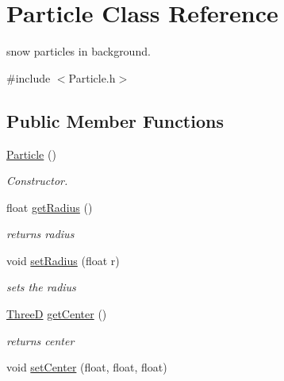 \hypertarget{class_particle}{\section{Particle Class Reference}
\label{class_particle}
}


snow particles in background.  




{\ttfamily \#include $<$Particle.\-h$>$}

\subsection*{Public Member Functions}
\begin{DoxyCompactItemize}
\item 
\hypertarget{class_particle_a40f4c7e248029d72e7714b7802d5e5e1}{\hyperlink{class_particle_a40f4c7e248029d72e7714b7802d5e5e1}{Particle} ()}\label{class_particle_a40f4c7e248029d72e7714b7802d5e5e1}

\begin{DoxyCompactList}\small\item\em Constructor. \end{DoxyCompactList}\item 
\hypertarget{class_particle_ae965a3d556ffe29c80c97bbb18ab2372}{float \hyperlink{class_particle_ae965a3d556ffe29c80c97bbb18ab2372}{get\-Radius} ()}\label{class_particle_ae965a3d556ffe29c80c97bbb18ab2372}

\begin{DoxyCompactList}\small\item\em returns radius \end{DoxyCompactList}\item 
\hypertarget{class_particle_a49ad7061bf2b2362e36b8930a089c188}{void \hyperlink{class_particle_a49ad7061bf2b2362e36b8930a089c188}{set\-Radius} (float r)}\label{class_particle_a49ad7061bf2b2362e36b8930a089c188}

\begin{DoxyCompactList}\small\item\em sets the radius \end{DoxyCompactList}\item 
\hypertarget{class_particle_af3af4113b96e3ad0e079b5f815063321}{\hyperlink{global_8h_a62cc051caefbc94bc22d587ea537d9e8}{Three\-D} \hyperlink{class_particle_af3af4113b96e3ad0e079b5f815063321}{get\-Center} ()}\label{class_particle_af3af4113b96e3ad0e079b5f815063321}

\begin{DoxyCompactList}\small\item\em returns center \end{DoxyCompactList}\item 
\hypertarget{class_particle_a44a08aee886d132e353eea78c28fbbb4}{void \hyperlink{class_particle_a44a08aee886d132e353eea78c28fbbb4}{set\-Center} (float, float, float)}\label{class_particle_a44a08aee886d132e353eea78c28fbbb4}


\end{DoxyCompactItemize}
